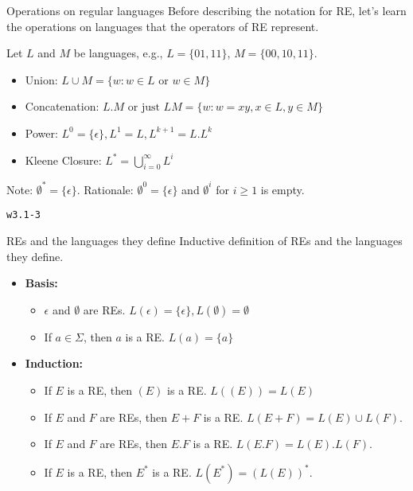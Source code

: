 \documentclass{prosper}%
\newcommand{\quiz}[1]{{\begin{flushright}\small\tt\blue #1 \end{flushright}}}
\begin{document}
\begin{slide}{Operations on regular languages}
Before describing the notation for RE, let's learn the operations on languages that the operators of RE represent.

Let $L$ and $M$ be languages, e.g., $L=\{01, 11\}$, $M=\{00, 10, 11\}$. 
\begin{itemize}
\item {\blue Union}: $L\cup M=\{w:w\in L \mbox{ or }w \in M\}$%
\item {\blue Concatenation}: $L.M\mbox{ or just\ } LM=\{w:w=xy, x\in L,y \in M\}$
\item {\blue Power}: $L^0=\{\epsilon\}, L^1=L, L^{k+1}=L.L^k$
\item {\blue Kleene Closure}: $L^*=\displaystyle\bigcup_{i=0}^\infty L^i$
\end{itemize}
Note: $\emptyset^*=\{\epsilon\}$. Rationale: $\emptyset^0=\{\epsilon\}$ and $ \emptyset^i$ for $i\geq1$ is empty. 
\quiz{w3.1-3}


%
\end{slide}
\begin{slide}{REs and the languages they define}
Inductive definition of REs and the languages they define.
\begin{itemize}
\item {\bf Basis:} \ \\
\begin{itemize}
\item $\epsilon$ and $\emptyset$ are REs. $L(\epsilon)=\{\epsilon\},  L(\emptyset)=\emptyset$

\item If $a\in\Sigma$, then $a$ is a RE. $L(a)=\{a\}$
\end{itemize}
\item {\bf Induction:} \ \\
\begin{itemize}
\item If $E$ is a RE, then $(E)$ is a RE. $L((E))=L(E)$

\item If $E$ and $F$ are REs, then $E + F$ is a RE. $L(E + F ) = L(E) \cup L(F )$.

\item If $E$ and $F$ are REs, then $E.F$ is a RE. $L(E.F ) = L(E).L(F )$. 

\item If $E$ is a RE, then $E^*$ is a RE. $L(E^*)=(L(E))^*$. 
\end{itemize}
\end{itemize}
\end{slide}
\end{document}
